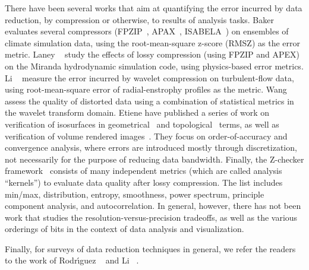 There have been several works that aim at quantifying the error incurred by data reduction, by
compression or otherwise, to results of analysis tasks. Baker
\etal~\cite{evaluating-compression-climate} evaluates several compressors (FPZIP~\cite{fpzip},
APAX~\cite{apax}, ISABELA~\cite{isabela}) on ensembles of climate simulation data, using the
root-mean-square z-score (RMSZ) as the error metric. Laney \etal~\cite{compression_sim2013} study
the effects of lossy compression (using FPZIP and APEX) on the Miranda hydrodynamic simulation code,
using physics-based error metrics. Li \etal~\cite{evaluating-efficacy-wavelet} measure the error
incurred by wavelet compression on turbulent-flow data, using root-mean-square error of
radial-enstrophy profiles as the metric. Wang \etal~\cite{statistical-volume-quality} assess the
quality of distorted data using a combination of statistical metrics in the wavelet transform
domain. Etiene \etal have published a series of work on verification of isosurfaces in
geometrical~\cite{verifiable-isosurface} and topological~\cite{topology-verification-isosurface}
terms, as well as verification of volume rendered images~\cite{verifying-volume-rendering}. They
focus on order-of-accuracy and convergence analysis, where errors are introduced mostly through
discretization, not necessarily for the purpose of reducing data bandwidth. Finally, the Z-checker
framework~\cite{z-checker} consists of many independent metrics (which are called analysis
``kernels'') to evaluate data quality after lossy compression. The list includes min/max,
distribution, entropy, smoothness, power spectrum, principle component analysis, and
autocorrelation. In general, however, there has not been work that studies the
resolution-versus-precision tradeoffs, as well as the various orderings of bits in the context of
data analysis and visualization.


Finally, for surveys of data reduction techniques in general, we refer the readers to the work of
Rodr\'{\i}guez \etal~\cite{state-of-the-art-compressed-volume} and Li \etal~\cite{li2018}.
